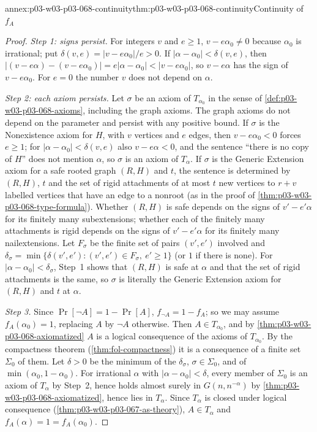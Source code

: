 \begin{annexitem}{annex:p03-w03-p03-068-continuity}{thm:p03-w03-p03-068-continuity}{Continuity of \(f_A\)}
\begin{proof}
\emph{Step 1: signs persist.}  For integers \(v\) and \(e\geq1\),
\(v-e\alpha_0\neq0\) because \(\alpha_0\) is irrational; put
\(\delta(v,e)=|v-e\alpha_0|/e>0\).  If \(|\alpha-\alpha_0|<\delta(v,e)\), then
\(|(v-e\alpha)-(v-e\alpha_0)|=e|\alpha-\alpha_0|<|v-e\alpha_0|\), so
\(v-e\alpha\) has the sign of \(v-e\alpha_0\).  For \(e=0\) the number \(v\)
does not depend on \(\alpha\).

\emph{Step 2: each axiom persists.}  Let \(\sigma\) be an axiom of
\(T_{\alpha_0}\) in the sense of \cref{def:p03-w03-p03-068-axioms},
including the graph axioms.  The graph axioms do not depend on the
parameter and persist with any positive bound.  If
\(\sigma\) is the Nonexistence axiom for \(H\), with \(v\) vertices and \(e\)
edges, then \(v-e\alpha_0<0\) forces \(e\geq1\); for
\(|\alpha-\alpha_0|<\delta(v,e)\) also \(v-e\alpha<0\), and the sentence
``there is no copy of \(H\)'' does not mention \(\alpha\), so \(\sigma\) is an
axiom of \(T_\alpha\).  If \(\sigma\) is the Generic Extension axiom for a safe
rooted graph \((R,H)\) and \(t\), the sentence is determined by \((R,H)\), \(t\)
and the set of rigid attachments of at most \(t\) new vertices to \(r+v\)
labelled vertices that have an edge to a nonroot (as in the proof of
\cref{thm:p03-w03-p03-068-type-formula}).  Whether \((R,H)\) is safe depends on
the signs of \(v'-e'\alpha\) for its finitely many subextensions; whether each
of the finitely many attachments is rigid depends on the signs of
\(v'-e'\alpha\) for its finitely many nailextensions.  Let \(F_\sigma\) be the
finite set of pairs \((v',e')\) involved and
\(\delta_\sigma=\min\{\delta(v',e'):(v',e')\in F_\sigma,\ e'\geq1\}\) (or
\(1\) if there is none).  For \(|\alpha-\alpha_0|<\delta_\sigma\), Step~1 shows
that \((R,H)\) is safe at \(\alpha\) and that the set of rigid attachments is
the same, so \(\sigma\) is literally the Generic Extension axiom for \((R,H)\)
and \(t\) at \(\alpha\).

\emph{Step 3.}  Since \(\Pr[\neg A]=1-\Pr[A]\), \(f_{\neg A}=1-f_A\); so we may
assume \(f_{A}(\alpha_0)=1\), replacing \(A\) by \(\neg A\) otherwise.  Then
\(A\in T_{\alpha_0}\), and by \cref{thm:p03-w03-p03-068-axiomatized} \(A\) is a
logical consequence of the axioms of \(T_{\alpha_0}\).  By the compactness
theorem (\cref{thm:fol-compactness}) it is a consequence of a finite set
\(\Sigma_0\) of them.  Let \(\delta>0\) be the minimum of the \(\delta_\sigma\),
\(\sigma\in\Sigma_0\), and of \(\min(\alpha_0,1-\alpha_0)\).  For irrational
\(\alpha\) with \(|\alpha-\alpha_0|<\delta\), every member of \(\Sigma_0\) is
an axiom of \(T_\alpha\) by Step~2, hence holds almost surely in
\(G(n,n^{-\alpha})\) by \cref{thm:p03-w03-p03-068-axiomatized}, hence lies in
\(T_\alpha\).  Since \(T_\alpha\) is closed under logical consequence
(\cref{thm:p03-w03-p03-067-as-theory}), \(A\in T_\alpha\) and
\(f_A(\alpha)=1=f_A(\alpha_0)\).
\end{proof}
\end{annexitem}

